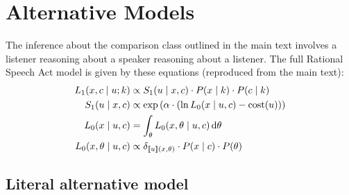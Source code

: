 \documentclass[doc]{apa6}
\begin{document}
\section{Alternative Models}


The inference about the comparison class outlined in the main text involves a listener reasoning about a speaker reasoning about a listener. The full Rational Speech Act model is given by these equations (reproduced from the main text): 
%
\begin{align}
L_1(x, c \mid u; k) &\propto S_1(u \mid x, c) \cdot P(x \mid k) \cdot P(c \mid k)  \label{eq:L1a} \\ 
S_1(u \mid x, c) &\propto \exp{(\alpha \cdot (\ln L_{0}(x \mid u, c) - \text{cost}(u) ))} \label{eq:S1b} \\
L_{0}(x \mid u, c) &= \int_{\theta} L_{0}(x, \theta \mid u, c) \mathop{}\!\mathrm{d}\theta \label{eq:L0_marg} \\ 
L_{0}(x, \theta \mid u, c) &\propto {\delta_{[\![u]\!](x, \theta)} \cdot P(x \mid c)} \cdot P(\theta) \label{eq:L0}
\end{align}



\subsection{Literal alternative model}
\end{document}
